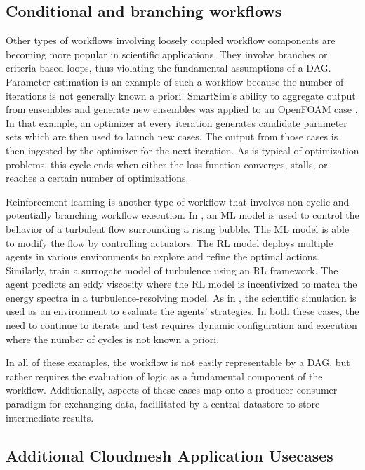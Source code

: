 \documentclass[sigconf]{acmart}
\begin{document}
\subsection{Conditional and branching workflows}

Other types of workflows involving loosely coupled workflow components are becoming more popular in scientific applications. They involve branches or criteria-based loops, thus violating the fundamental assumptions of a DAG. Parameter estimation is an example of such a workflow because the number of iterations is not generally known a priori. SmartSim's ability to aggregate output from ensembles and generate new ensembles was applied to an OpenFOAM case \citep{Maric2024OpenFOAM}. In that example, an optimizer at every iteration generates candidate parameter sets which are then used to launch new cases. The output from those cases is then ingested by the optimizer for the next iteration. As is typical of optimization problems, this cycle ends when either the loss function converges, stalls, or reaches a certain number of optimizations.

Reinforcement learning is another type of workflow that involves non-cyclic and potentially branching workflow execution. In \citep{Font2024}, an ML model is used to control the behavior of a turbulent flow surrounding a rising bubble. The ML model is able to modify the flow by controlling actuators.  The RL model deploys multiple agents in various environments to explore and refine the optimal actions. Similarly, \citep{kurz2023deep} train a surrogate model of turbulence using an RL framework. The agent predicts an eddy viscosity where the RL model is incentivized to match the energy spectra in a turbulence-resolving model. As in \citep{Font2024}, the scientific simulation is used as an environment to evaluate the agents' strategies. In both these cases, the need to continue to iterate and test requires dynamic configuration and execution where the number of cycles is not known a priori.

In all of these examples, the workflow is not easily representable by a DAG, but rather requires the evaluation of logic as a fundamental component of the workflow. Additionally, aspects of these cases map onto a producer-consumer paradigm for exchanging data, facillitated by a central datastore to store intermediate results.


\subsection{Additional Cloudmesh Application Usecases}
\end{document}
